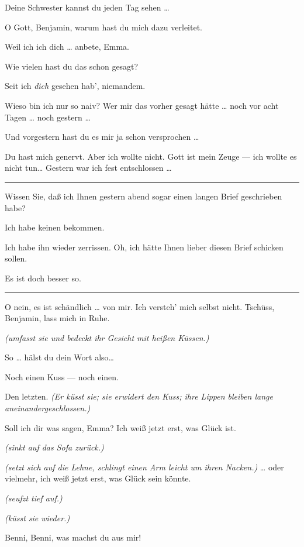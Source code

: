 \documentclass[
	final,
	a4paper,
	ngerman,
	mpinclude = true, %
	twoside = true,
	open = right,
	cleardoublepage = plain,
	DIV = 13,
	BCOR = 1cm,
	titlepage = firstiscover,
	]{scrbook}
\newcommand{\direction}[1]{\textit{(#1)}}
\newenvironment{deletion}{%
		\vspace{0.25\baselineskip}
		\hrule
		\vspace{0.25\baselineskip}
		\color{darkgray}
	}{
		\color{black}
		\vspace{0.25\baselineskip}
		\hrule 
		\vspace{0.25\baselineskip}
	}
\newcommand{\thecharacter}[1]{\textup{\textsc{#1}}\xspace}
\newcommand{\theherr}{\thecharacter{Benjamin}}
\newcommand{\thefrau}{\thecharacter{Emma}}
\newcommand{\character}[1]{\item[#1:]}
\newcommand{\herr}{\character{\theherr}}
\newcommand{\frau}{\character{\thefrau}}
\begin{document}
\begin{play}
	\herr
	Deine Schwester kannst du jeden Tag sehen \ldots{}

	\frau
	O Gott, Benjamin, warum hast du mich dazu verleitet.

	\herr
	Weil ich ich dich \ldots{} anbete, Emma.

	\frau
	Wie vielen hast du das schon gesagt?

	\herr
	Seit ich \emph{dich} gesehen hab', niemandem.

	\frau
	Wieso bin ich nur so naiv? Wer mir das vorher gesagt hätte \ldots{} noch vor acht Tagen \ldots{} noch gestern \ldots{}

	\herr
	Und vorgestern hast du es mir ja schon versprochen \ldots{}

	\frau
	Du hast mich genervt. Aber ich wollte nicht. Gott ist mein Zeuge --- ich wollte es nicht tun\ldots{} Gestern war ich fest entschlossen \ldots{}
	\begin{deletion}
	Wissen Sie, daß ich Ihnen gestern abend sogar einen langen Brief geschrieben habe?

	\herr
	Ich habe keinen bekommen.

	\frau
	Ich habe ihn wieder zerrissen. Oh, ich hätte Ihnen lieber diesen Brief schicken sollen.

	\herr
	Es ist doch besser so.
	\end{deletion}
	O nein, es ist schändlich \ldots{} von mir. Ich versteh' mich selbst nicht. Tschüss, Benjamin, lass mich in Ruhe.

	\herr
	\direction{umfasst sie und bedeckt ihr Gesicht mit heißen Küssen.}

	\frau
	So \ldots{} hälst du dein Wort also\ldots{}

	\herr
	Noch einen Kuss --- noch einen.

	\frau
	Den letzten. \direction{Er küsst sie; sie erwidert den Kuss; ihre Lippen bleiben lange aneinandergeschlossen.}

	\herr
	Soll ich dir was sagen, Emma? Ich weiß jetzt erst, was Glück ist.

	\frau
	\direction{sinkt auf das Sofa zurück.}

	\herr
	\direction{setzt sich auf die Lehne, schlingt einen Arm leicht um ihren Nacken.} \ldots{} oder vielmehr, ich weiß jetzt erst, was Glück sein könnte.

	\frau
	\direction{seufzt tief auf.}

	\herr
	\direction{küsst sie wieder.}

	\frau
	Benni, Benni, was machst du aus mir!


\end{play}
\end{document}
